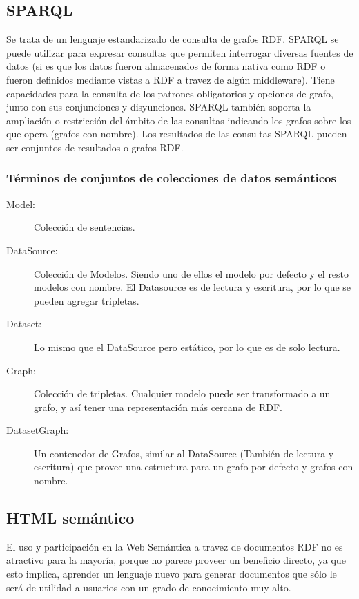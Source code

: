 \subsection{SPARQL}

Se trata de un lenguaje estandarizado de consulta de grafos RDF.
SPARQL se puede utilizar para expresar consultas que permiten interrogar diversas fuentes de datos (si es que los datos fueron almacenados 
de forma nativa como RDF o fueron definidos mediante vistas a RDF a travez de algún middleware). Tiene capacidades para la consulta
de los patrones obligatorios y opciones de grafo, junto con sus conjunciones y disyunciones. SPARQL también soporta 
la ampliación o restricción del ámbito de las consultas indicando los grafos sobre los que opera (grafos con nombre). Los resultados de las consultas
SPARQL pueden ser conjuntos de resultados o grafos RDF.

\subsubsection{Términos de conjuntos de colecciones de datos semánticos}

\begin{description}
 \item[Model:] Colección de sentencias.

 \item[DataSource:] Colección de Modelos. Siendo uno de ellos el modelo por defecto y el resto modelos con nombre. El Datasource es de lectura y escritura, por lo que se pueden agregar tripletas.

 \item[Dataset:] Lo mismo que el DataSource pero estático, por lo que es de solo lectura.

 \item[Graph:] Colección de tripletas. Cualquier modelo puede ser transformado a un grafo, y así tener una representación más cercana de RDF.

 \item[DatasetGraph:] Un contenedor de Grafos, similar al DataSource (También de lectura y escritura) que provee una estructura para un grafo por defecto y grafos con nombre.
\end{description}

\subsection{HTML semántico}

El uso y participación en la Web Semántica a travez de documentos RDF no es atractivo para la mayoría, porque no parece proveer un beneficio 
directo, ya que esto implica, aprender un lenguaje nuevo para generar documentos que sólo le será de utilidad a usuarios con un grado de conocimiento 
muy alto. 


